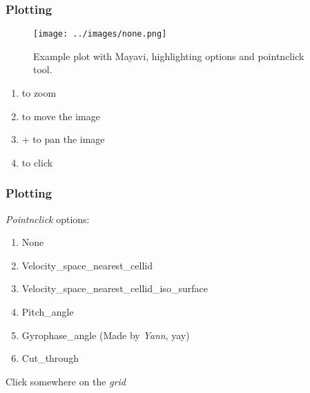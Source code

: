 \documentclass{beamer}
\begin{document}
\begin{frame}[fragile]
 \frametitle{Plotting}
 \begin{center}
 
 \begin{figure}
  \centering
  \texttt{[image: ../images/none.png]}
  \caption{\tiny{Example plot with Mayavi, highlighting options and pointnclick tool.}}
  \label{fig:mayavi_example2}
 \end{figure}
 
 \begin{enumerate}
  \item {} to zoom
  \item {} to move the image
  \item {} +  to pan the image
  \item {} to click
 \end{enumerate}

 \end{center}
 
\end{frame}

\begin{frame}[fragile]
 \frametitle{Plotting}
 \begin{center}
 \end{center}
 \emph{Pointnclick} options:
 \begin{enumerate}
  \item None
  \item Velocity\_space\_nearest\_cellid
  \item Velocity\_space\_nearest\_cellid\_iso\_surface
  \item Pitch\_angle
  \item Gyrophase\_angle (Made by \emph{Yann}, yay)
  \item Cut\_through
 \end{enumerate}

 Click  somewhere on the \emph{grid}
\end{frame}
\end{document}

